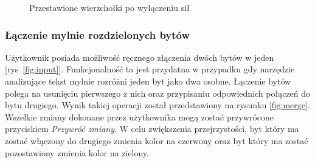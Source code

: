 \documentclass[12pt,a4paper]{article} %
\begin{document}
            \begin{figure}[h!]
            \centering
            \begin{subfigure}{.45\textwidth}
              \centering
            \end{subfigure}
            \begin{subfigure}{.45\textwidth}
              \centering
            \end{subfigure}
            \caption{Przestawione wierzchołki po wyłączeniu sił}
            \label{fig:forceOff}
            \end{figure}
            
        \subsubsection{Łączenie mylnie rozdzielonych bytów}
            
            Użytkownik posiada możliwość ręcznego złączenia dwóch bytów w jeden [rys~\ref{fig:input}]. Funkcjonalność ta jest przydatna w przypadku gdy narzędzie analizujące tekst mylnie rozróżni jeden byt jako dwa osobne. Łączenie bytów polega na usunięciu pierwszego z nich oraz przypisaniu odpowiednich połączeń do bytu drugiego. Wynik takiej operacji został przedstawiony na rysunku \ref{fig:merge}. Wszelkie zmiany dokonane przez użytkownika mogą zostać przywrócone przyciskiem \textit{Przywróć zmiany}. W celu zwiększenia przejrzystości, byt który ma zostać włączony do drugiego zmienia kolor na czerwony oraz byt który ma zostać pozostawiony zmienia kolor na zielony.
    
\end{document}

